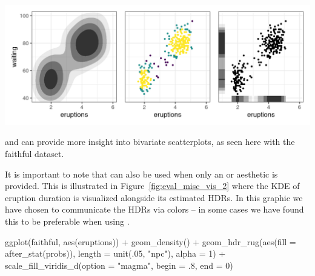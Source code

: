 \newpage

\begin{knitrout}
\color{fgcolor}\begin{widefigure}[h!]

{\centering \includegraphics[width=\maxwidth]{figures/eval_misc_vis-1}

}

\caption{ and  can provide more insight into bivariate scatterplots, as seen here with the faithful dataset.}\label{fig:eval_misc_vis}
\end{widefigure}

\end{knitrout}


It is important to note that  can also be used when only an  or  aesthetic is provided.
This is illustrated in Figure~\ref{fig:eval_misc_vis_2} where the KDE of eruption duration is visualized alongside its estimated HDRs.
In this graphic we have chosen to communicate the HDRs via colors -- in some cases we have found this to be preferable when using .

\begin{knitrout}
\color{fgcolor}\begin{kframe}
\begin{example}
ggplot(faithful, aes(eruptions)) +
  geom_density() +
  geom_hdr_rug(aes(fill = after_stat(probs)), length = unit(.05, "npc"), alpha = 1) +
  scale_fill_viridis_d(option = "magma", begin = .8, end = 0)
\end{example}
\end{kframe}
\end{knitrout}

